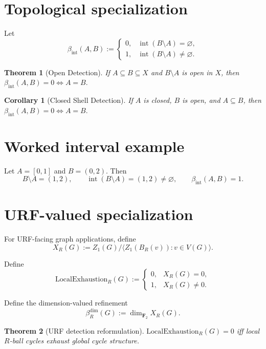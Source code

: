 \documentclass[11pt]{article}
\newtheorem{theorem}{Theorem}
\newtheorem{corollary}{Corollary}
\begin{document}
\section{Topological specialization}

Let
\[
\beta_{\mathrm{int}}(A,B):=
\begin{cases}
0,&\operatorname{int}(B\setminus A)=\varnothing,\\
1,&\operatorname{int}(B\setminus A)\neq\varnothing.
\end{cases}
\]

\begin{theorem}[Open Detection]
If \(A \subseteq B \subseteq X\) and \(B\setminus A\) is open in \(X\), then
\(\beta_{\mathrm{int}}(A,B)=0 \iff A=B.\)
\end{theorem}

\begin{corollary}[Closed Shell Detection]
If \(A\) is closed, \(B\) is open, and \(A\subseteq B\), then
\(\beta_{\mathrm{int}}(A,B)=0 \iff A=B.\)
\end{corollary}

\section{Worked interval example}

Let \(A=[0,1]\) and \(B=(0,2)\). Then
\[
B\setminus A=(1,2),
\qquad
\operatorname{int}(B\setminus A)=(1,2)\neq\varnothing,
\qquad
\beta_{\mathrm{int}}(A,B)=1.
\]

\section{URF-valued specialization}

For URF-facing graph applications, define
\[
X_R(G):=Z_1(G)\big/\langle Z_1(B_R(v)) : v\in V(G)\rangle.
\]

Define
\[
\mathrm{LocalExhaustion}_R(G):=
\begin{cases}
0,&X_R(G)=0,\\
1,&X_R(G)\neq 0.
\end{cases}
\]

Define the dimension-valued refinement
\[
\beta^{\dim}_{R}(G):=\dim_{\mathbf F_2} X_R(G).
\]

\begin{theorem}[URF detection reformulation]
\(\mathrm{LocalExhaustion}_R(G)=0\) iff local \(R\)-ball cycles exhaust global cycle structure.
\end{theorem}
\end{document}

